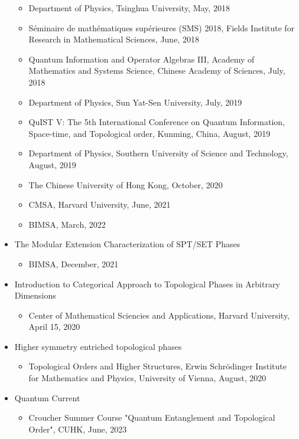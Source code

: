 \documentclass[hidelinks,a4paper]{article}
\begin{document}
\begin{itemize}
  \begin{itemize}\small
    \item Department of Physics, Tsinghua University, May, 2018
    \item Séminaire de mathématiques supérieures (SMS) 2018, Fields Institute for Research in Mathematical Sciences, June, 2018
    \item Quantum Information and Operator Algebras III, Academy of Mathematics and Systems Science, Chinese Academy of Sciences, July, 2018
    \item Department of Physics, Sun Yat-Sen University, July, 2019
    \item QuIST V: The 5th International Conference on Quantum Information,
      Space-time, and Topological order, Kunming, China, August, 2019
      \item 	Department of Physics, Southern University of Science and Technology, August, 2019
    \item The Chinese University of Hong Kong, October, 2020
    \item CMSA, Harvard University, June, 2021
    \item BIMSA, March, 2022
  \end{itemize}
  \item The Modular Extension Characterization of SPT/SET Phases~\supercite{LKW1507.04673,LKW1602.05936,LKW1602.05946}
  \begin{itemize}
    \item BIMSA, December, 2021
  \end{itemize}
  \item Introduction to Categorical Approach to Topological Phases in Arbitrary Dimensions
  \begin{itemize}\small
     \item Center of Mathematical Sciencies and Applications, Harvard University, April 15, 2020
  \end{itemize}
  \item Higher symmetry entriched topological phases~\supercite{KLW+2003.08898,KLW+2005.14178}
  \begin{itemize}\small
     \item  Topological Orders and Higher Structures, Erwin Schrödinger Institute for Mathematics and Physics, University of Vienna, August, 2020
  \end{itemize}
  \item Quantum Current~\supercite{LZ2305.12917}
  \begin{itemize}\small
     \item  Croucher Summer Course "Quantum Entanglement and Topological Order", CUHK, June, 2023

\end{itemize}
\end{itemize}
\end{document}
